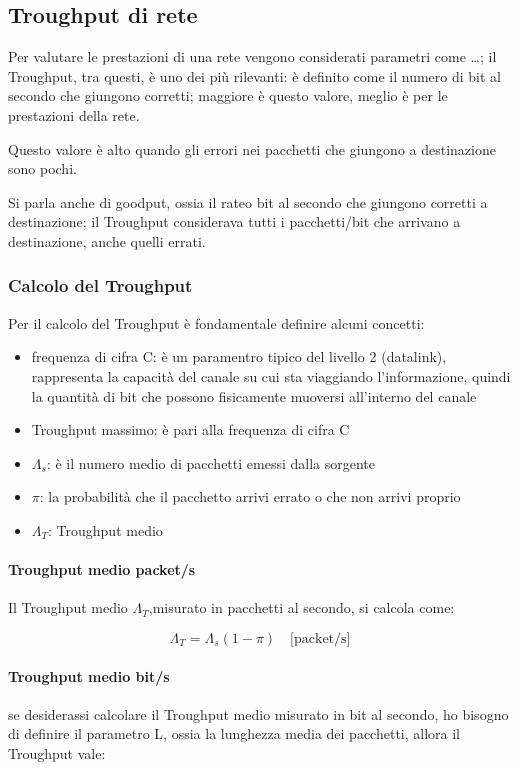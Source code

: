 \subsection{Troughput di rete}
Per valutare le prestazioni di una rete vengono considerati parametri come \dots;
il Troughput, tra questi, è uno dei più rilevanti: è definito come il numero di bit al secondo che giungono corretti; maggiore è questo valore, meglio è per le prestazioni della rete.

Questo valore è alto quando gli errori nei pacchetti che giungono a destinazione sono pochi.

Si parla anche di goodput, ossia il rateo bit al secondo che giungono corretti a destinazione; il Troughput considerava tutti i pacchetti/bit che arrivano a destinazione, anche quelli errati.



\subsubsection{Calcolo del Troughput}

Per il calcolo del Troughput è fondamentale definire alcuni concetti:
\begin{itemize}
    \item frequenza di cifra C: è un paramentro tipico del livello 2 (datalink), rappresenta la capacità del canale su cui sta viaggiando l'informazione, quindi la quantità di bit che possono fisicamente muoversi all'interno del canale
    \item Troughput massimo: è pari alla frequenza di cifra C
    \item $\Lambda_s$: è il numero medio di pacchetti emessi dalla sorgente
    \item $\pi$: la probabilità che il pacchetto arrivi errato o che non arrivi proprio
    \item $\Lambda_T$: Troughput medio
\end{itemize}
\paragraph{Troughput medio packet/s}
Il Troughput medio $\Lambda_T$,misurato in pacchetti al secondo, si calcola come:

\begin{equation}
    \Lambda_T = \Lambda_s (1 - \pi) \quad \text{[packet/s]}
\end{equation}
\paragraph{Troughput medio bit/s}
se desiderassi calcolare il Troughput medio misurato in bit al secondo, ho bisogno di definire il parametro L, ossia la lunghezza media dei pacchetti, allora il Troughput vale:


